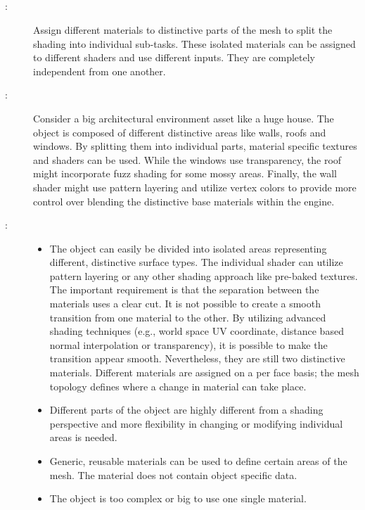 \subsection{\patAlternativeDifferentMatierals}\label{\patAlternativeDifferentMatierals}
\begin{description}
	\item[\patIntent:]%
	Assign different materials to distinctive parts of the mesh to split the shading into individual sub-tasks. These isolated materials can be assigned to different shaders and  use different inputs. They are completely independent from one another.   
	\item[\patMotivation:]%
	Consider a big architectural environment asset like a huge house. The object is composed of different distinctive areas like walls, roofs and windows. By splitting them into individual parts, material specific textures and shaders can be used. While the windows use transparency, the roof might incorporate fuzz shading for some mossy areas. Finally, the wall shader might use pattern layering and utilize vertex colors to provide more control over blending the distinctive base materials within the engine. 
	\item[\patApplicability:]\hfill
	\begin{itemize}\mynobreakpar
		\item The object can easily be divided into isolated areas representing different, distinctive surface types. The individual shader can utilize pattern layering or any other shading approach like pre-baked textures. The important requirement is that the separation between the materials uses a clear cut. It is not possible to create a smooth transition from one material to the other. By utilizing advanced shading techniques (e.g., world space UV coordinate, distance based normal interpolation or transparency), it is possible to make the transition appear smooth. Nevertheless, they are still two distinctive materials. Different materials are assigned on a per face basis; the mesh topology defines where a change in material can take place. 
		\item Different parts of the object are highly different from a shading perspective and more flexibility in changing or modifying individual areas is needed.
		\item Generic, reusable materials can be used to define certain areas of the mesh. The material does not contain object specific data. 
		\item The object is too complex or big to use one single material. 

\end{itemize}
\end{description}
